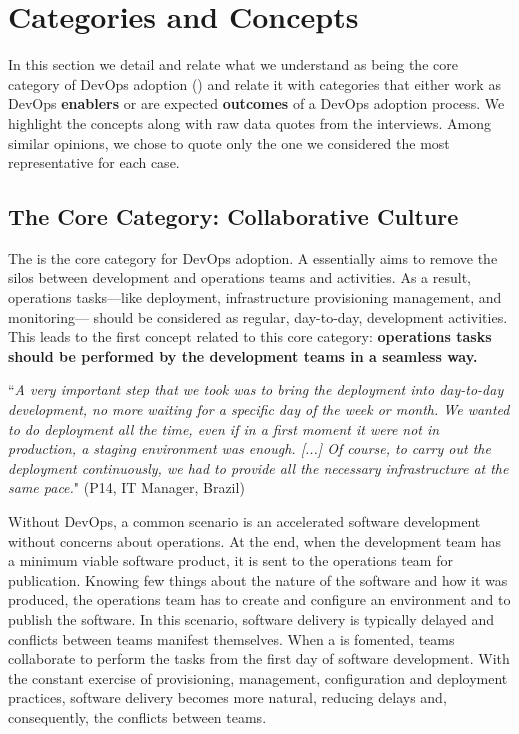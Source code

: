 \section{Categories and Concepts} \label{sec:categories_concepts}

In this section we detail and relate
what we understand as being the core category
of DevOps adoption (\cc)
and relate it with categories that either work as DevOps {\bf enablers} or
are expected {\bf outcomes} of a DevOps adoption process.
We highlight the concepts along with raw data quotes from the interviews.
Among similar opinions, we chose to quote only the one we
considered the most representative for each case.

\subsection{The Core Category: Collaborative Culture}

The \cc is the core category
for DevOps adoption. A \cc essentially aims to remove
the silos between development and operations teams and activities.
As a result, operations tasks---like deployment, infrastructure provisioning
management, and monitoring--- should be considered as regular, day-to-day,
development activities. This leads to the first concept related to
this core category: {\bf operations tasks should be performed by
the development teams in a seamless way.}

\begin{mq}
``\emph{A very important step that we took was to bring the deployment into day-to-day
development, no more waiting for a specific day of the week or month. We wanted
to do deployment all the time, even if in a first moment it were not in
production, a staging environment was enough. [...] Of course, to carry out the deployment
continuously, we had to provide all the necessary infrastructure at the same
pace.}" (P14, IT Manager, Brazil)
\end{mq}

Without DevOps, a common scenario is an accelerated software development
without concerns about operations. At the end, when the development team has a
minimum viable software product, it is sent to the operations team for
publication. Knowing few things about the nature of the software and how it
was produced, the operations team has to create and configure an environment
and to publish the software. In this scenario, software delivery is typically
delayed and conflicts between teams manifest themselves. When a \cc is fomented, teams collaborate to perform the tasks from the first day
of software development. With the constant exercise of provisioning, management,
configuration and deployment practices, software delivery becomes more natural,
reducing delays and, consequently, the conflicts between teams.

